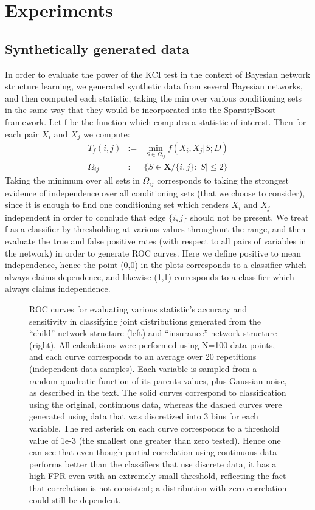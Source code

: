 \documentclass{article} %
\begin{document}
\section{Experiments}


\subsection{Synthetically generated data}
In order to evaluate the power of the KCI test in the context of Bayesian network structure learning, we generated synthetic data from several Bayesian networks, and then computed each statistic, taking the min over various conditioning sets in the same way that they would be incorporated into the SparsityBoost framework.  Let f be the function which computes a statistic of interest. Then for each pair $X_i$ and $X_j$ we compute:  \begin{eqnarray*} T_f(i,j) &:=& \min_{S \in \Omega_{ij} } f(X_i,X_j | S; D) \\ \Omega_{ij} &:=& \{ S \in \mathbf{X} / \{i,j\} : |S| \leq 2 \} \end{eqnarray*}  Taking the minimum over all sets in $\Omega_{ij}$ corresponds to taking the strongest evidence of independence over all conditioning sets (that we choose to consider), since it is enough to find one conditioning set which renders $X_i$ and $X_j$ independent in order to conclude that edge $\{i,j\}$ should not be present.  We treat f as a classifier by thresholding at various values throughout the range, and then evaluate the true and false positive rates (with respect to all pairs of variables in the network) in order to generate ROC curves.  Here we define positive to mean independence, hence the point (0,0) in the plots corresponds to a classifier which always claims dependence, and likewise (1,1) corresponds to a classifier which always claims independence.

\begin{figure}[h]
\centering
    \quad
\caption{ROC curves for evaluating various statistic's accuracy and sensitivity in classifying joint distributions generated from the ``child'' network structure (left) and ``insurance'' network structure (right).  All calculations were performed using N=100 data points, and each curve corresponds to an average over 20 repetitions (independent data samples).  Each variable is sampled from a random quadratic function of its parents values, plus Gaussian noise, as described in the text.  The solid curves correspond to classification using the original, continuous data, whereas the dashed curves were generated using data that was discretized into 3 bins for each variable.  The red asterisk on each curve corresponds to a threshold value of 1e-3 (the smallest one greater than zero tested).  Hence one can see that even though partial correlation using continuous data performs better than the classifiers that use discrete data, it has a high FPR even with an extremely small threshold, reflecting the fact that correlation is not consistent; a distribution with zero correlation could still be dependent. }
\label{fig:ROC}
\end{figure}
\end{document}
